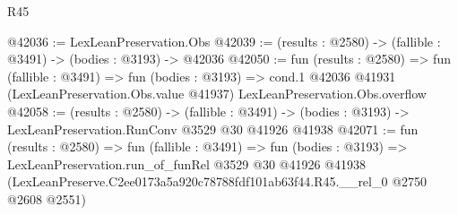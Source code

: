 \begin{lexlean}{R45}
\begin{coremodule}
@42036 := LexLeanPreservation.Obs
@42039 := (results : @2580) -> (fallible : @3491) -> (bodies : @3193) -> @42036
@42050 := fun (results : @2580) =>
  fun (fallible : @3491) =>
  fun (bodies : @3193) =>
  cond.{1} @42036 @41931 (LexLeanPreservation.Obs.value @41937) LexLeanPreservation.Obs.overflow
@42058 := (results : @2580) ->
  (fallible : @3491) -> (bodies : @3193) -> LexLeanPreservation.RunConv @3529 @30 @41926 @41938
@42071 := fun (results : @2580) =>
  fun (fallible : @3491) =>
  fun (bodies : @3193) =>
  LexLeanPreservation.run_of_funRel
    @3529
    @30
    @41926
    @41938
    (LexLeanPreserve.C2ee0173a5a920c78788fdf101ab63f44.R45.__rel_0 @2750 @2608 @2551)
\end{coremodule}
\end{lexlean}
